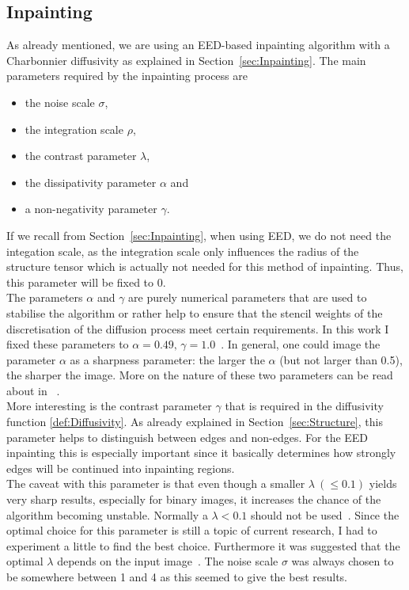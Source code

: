 \subsection{Inpainting}\label{sec:InpaintingEx}
As already mentioned, we are using an EED-based inpainting algorithm with a Charbonnier diffusivity
as explained in Section~\ref{sec:Inpainting}.
The main parameters required by the inpainting process are 
\begin{itemize}
    \item the noise scale $\sigma$,
    \item the integration scale $\rho$,
    \item the contrast parameter $\lambda$, 
    \item the dissipativity parameter $\alpha$ and
    \item a non-negativity parameter $\gamma$.
\end{itemize}
If we recall from Section~\ref{sec:Inpainting}, when using EED, we do not need the integation scale, as the
integration scale only influences the radius of the structure tensor which is actually not needed
for this method of inpainting. Thus, this parameter will be fixed to 0.\\
The parameters $\alpha$ and $\gamma$ are purely numerical parameters that are used to 
stabilise the algorithm or rather help to ensure that the stencil weights of the discretisation of
the diffusion process meet certain requirements.
In this work I fixed these parameters to $\alpha=0.49,\, \gamma=1.0$~\cite{conversation}.
In general, one could image the parameter $\alpha$ as a sharpness parameter: the larger the
$\alpha$ (but not larger than 0.5), the sharper the image. More on the nature of these two parameters can be read about in
~\cite{www13, weickert96}.\\
More interesting is the contrast parameter $\gamma$ that is required in the diffusivity function
\eqref{def:Diffusivity}. As already explained in Section~\ref{sec:Structure}, this parameter helps to
distinguish between edges and non-edges. For the EED inpainting this is especially important since
it basically determines how strongly edges will be continued into inpainting regions. \\
The caveat with this parameter is that even though a smaller $\lambda\ (\leq0.1)$ yields very sharp
results, especially for binary images, it increases the chance of the algorithm becoming unstable.
Normally a $\lambda<0.1$ should not be used~\cite{conversation}. Since the optimal choice for this parameter is still a
topic of current research, I had to experiment a little to find the best choice. Furthermore it was
suggested that the optimal $\lambda$ depends on the input image~\cite{schmaltz14}. 
The noise scale $\sigma$ was always chosen to be somewhere between 1 and 4 as this seemed to give
the best results.
